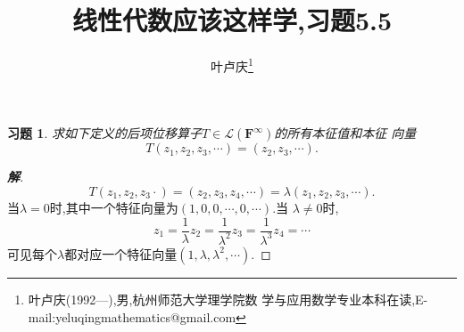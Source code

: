 ﻿\documentclass[a4paper]{article}
\newtheorem*{exa}{习题}
\newenvironment{example}
{\bigskip\begin{mdframed}\begin{exa}}
    {\end{exa}\end{mdframed}\bigskip}
\begin{document}
\title{\huge{\bf{线性代数应该这样学,习题5.5}}}
\author{\small{叶卢庆\footnote{叶卢庆(1992---),男,杭州师范大学理学院数
      学与应用数学专业本科在读,E-mail:yeluqingmathematics@gmail.com}}}
\maketitle\ni
\begin{example}
求如下定义的后项位移算子$T\in \mathcal{L}(\mathbf{F}^{\infty})$的所有本征值和本征
向量
$$
T(z_1,z_2,z_3,\cdots)=(z_2,z_3,\cdots).
$$
\end{example}
\begin{proof}[\textbf{解}]
$$
T(z_1,z_2,z_3\cdot)=(z_2,z_3,z_{4},\cdots)=\lambda(z_1,z_2,z_3,\cdots).
$$
当$\lambda=0$时,其中一个特征向量为$(1,0,0,\cdots,0,\cdots)$.当
$\lambda\neq 0$时,
$$
z_1=\frac{1}{\lambda}z_2=\frac{1}{\lambda^2}z_3=\frac{1}{\lambda^3}z_4=\cdots
$$
可见每个$\lambda$都对应一个特征向量$(1,\lambda,\lambda^2,\cdots)$.
\end{proof}
\end{document}
